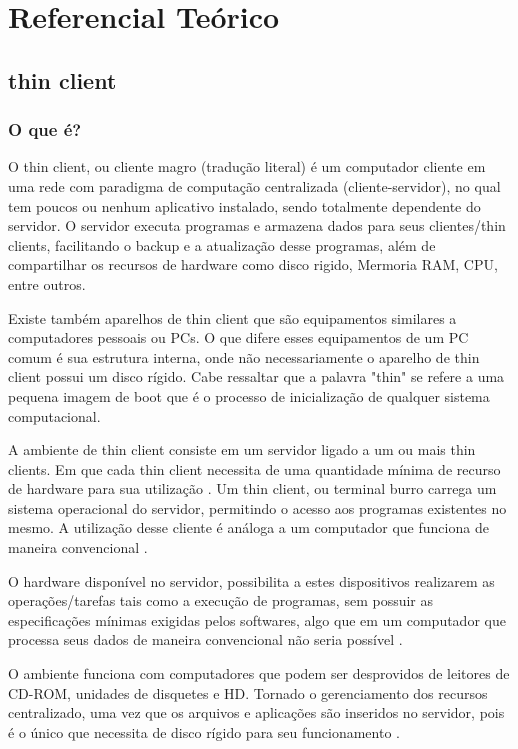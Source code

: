\documentclass[
	12pt,				%
	openright,			%
	twoside,			%
	a4paper,			%
	chapter=TITLE,		%
	english,			%
	brazil				%
	]{abntex2}
\begin{document}
\part{Referencial Teórico}

\chapter{thin client}

\section{O que é?}

O thin client, ou cliente magro (tradução literal) é um computador cliente em uma rede  com paradigma de computação centralizada (cliente-servidor), no qual tem poucos ou nenhum aplicativo instalado, sendo totalmente dependente do servidor. O servidor executa programas e armazena dados para seus clientes/thin clients, facilitando o backup e a atualização desse programas, além de compartilhar os recursos de hardware como disco rigido, Mermoria RAM, CPU, entre outros\cite{ComoFuncionaThinClient, tanenbaum2010sistemas}.

Existe também aparelhos de thin client que são equipamentos similares a computadores pessoais ou PCs. O que difere esses equipamentos de um PC comum é sua estrutura interna, onde não necessariamente o aparelho de thin client possui um disco rígido. Cabe ressaltar que a palavra "thin" se refere a uma pequena imagem de boot que é o processo de inicialização de qualquer sistema computacional\cite{ComoFuncionaThinClient}.

A ambiente de thin client consiste em um servidor ligado a um ou mais thin clients. Em que cada thin client necessita de uma quantidade mínima de recurso de hardware para sua utilização \cite{TopologiaClienteThin}. Um thin client, ou terminal burro carrega um sistema operacional do servidor, permitindo o acesso aos  programas existentes no mesmo. A utilização desse cliente é análoga a um computador que funciona de maneira convencional \cite{ComoFuncionaThinClient, morimotoservidores}.

O hardware disponível no servidor, possibilita a estes dispositivos realizarem as operações/tarefas tais como a execução de programas, sem possuir as especificações mínimas exigidas pelos softwares, algo que em um computador que processa seus dados de maneira convencional não seria possível \cite{tanenbaum2010sistemas}.

O ambiente funciona com computadores que podem ser desprovidos de leitores de CD-ROM, unidades de disquetes e HD. Tornado o gerenciamento dos recursos centralizado, uma vez que os  arquivos e aplicações são inseridos no servidor, pois é o único que necessita de disco rígido para seu funcionamento \cite{tanenbaum2010sistemas, ComoFuncionaThinClient}.
\end{document}
